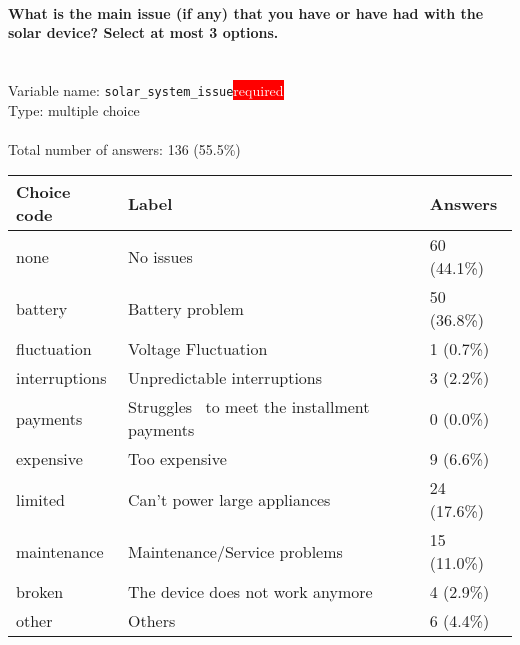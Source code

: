 \documentclass[11.5pt, a4paper]{scrartcl}
\begin{document}
\paragraph{What is the main issue (if any) that you have or have had with the solar device? Select at most 3 options.}
\  \\Variable name: \texttt{solar\_system\_issue}\hfill\colorbox{red}{\small{\textcolor{white}{required}}}\\
 Type: multiple choice\\
\\Total number of answers: 136 (55.5\%)
\\[0.2em] \begin{tabular}{p{4cm}|p{8cm}|p{3cm}}
Choice code & Label & Answers \\
\hline
none & No issues& \cellcolor{color2}60 (44.1\%)\\
\cellcolor{mygray} battery & \cellcolor{mygray}Battery problem & \cellcolor{color1}50 (36.8\%)\\
fluctuation & Voltage Fluctuation& \cellcolor{color0}1 (0.7\%)\\
\cellcolor{mygray} interruptions & \cellcolor{mygray}Unpredictable interruptions & \cellcolor{color0}3 (2.2\%)\\
payments & Struggles  to meet the installment payments& \cellcolor{color0}0 (0.0\%)\\
\cellcolor{mygray} expensive & \cellcolor{mygray}Too expensive & \cellcolor{color0}9 (6.6\%)\\
limited & Can't power large appliances& \cellcolor{color0}24 (17.6\%)\\
\cellcolor{mygray} maintenance & \cellcolor{mygray}Maintenance/Service problems & \cellcolor{color0}15 (11.0\%)\\
broken & The device does not work anymore& \cellcolor{color0}4 (2.9\%)\\
\cellcolor{mygray} other & \cellcolor{mygray}Others & \cellcolor{color0}6 (4.4\%)\\
\end{tabular}
\end{document}
